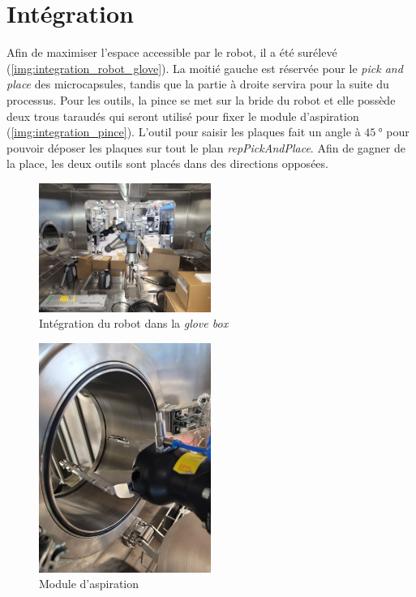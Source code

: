 \section{Intégration}
Afin de maximiser l'espace accessible par le robot, il a été surélevé (\cf \autoref{img:integration_robot_glove}). La moitié gauche est réservée pour le \textit{pick and place} des microcapsules, tandis que la partie à droite servira pour la suite du processus.
Pour les outils, la pince se met sur la bride du robot et elle possède deux trous taraudés qui seront utilisé pour fixer le module d'aspiration (\cf \autoref{img:integration_pince}).
L'outil pour saisir les plaques fait un angle à $\qty{45}{\degree}$ pour pouvoir déposer les plaques sur tout le plan \textit{repPickAndPlace}. Afin de gagner de la place, les deux outils sont placés dans des directions opposées.
\begin{figure}[]
    \centering
    \includegraphics[width = 0.5\textwidth]{assets/figures/Hardware/gloveBox.jpeg}
    \caption{Intégration du robot dans la \textit{glove box}}
    \label{img:integration_robot_glove}
\end{figure}
\begin{figure}[]
    \centering
    \includegraphics[width = 0.5\textwidth]{assets/figures/Hardware/outil_complet.jpeg}
    \caption{Module d'aspiration}
    \label{img:integration_pince}
\end{figure}